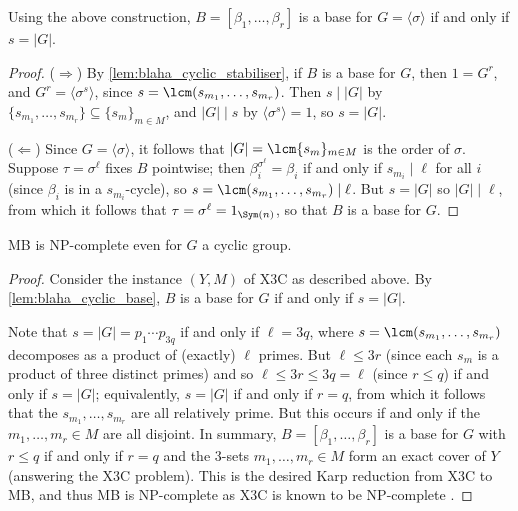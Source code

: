 \begin{lemma}\label{lem:blaha_cyclic_base}
    Using the above construction, $B = [\beta_1,\dotsc,\beta_r]$ is a base for $G = \langle \sigma \rangle$ if and only if $s = |G|$.
\end{lemma}

\begin{proof}
    ($\Longrightarrow$) By \autoref{lem:blaha_cyclic_stabiliser}, if $B$ is a base for $G$, then $1 = G^r$, and $G^r = \langle \sigma^s\rangle$, since $s = \lcm(s_{m_1},\dotsc,s_{m_r})$. Then $s \mid |G|$ by $\{s_{m_1},\dotsc,s_{m_r}\} \subseteq \{s_m\}_{m \in M}$, and $|G| \mid s$ by $\langle \sigma^s \rangle = 1$, so $s = |G|$.

    ($\Longleftarrow$) Since $G = \langle \sigma \rangle$, it follows that $|G| = \lcm\{s_m\}_{m \in M}$ is the order of $\sigma$. Suppose $\tau = \sigma^\ell$ fixes $B$ pointwise; then $\beta_i^{\sigma^\ell} = \beta_i$ if and only if $s_{m_i} \mid \ell$ for all $i$ (since $\beta_i$ is in a $s_{m_i}$-cycle), so $s = \lcm(s_{m_1},\dotsc,s_{m_r}) \mid \ell$. But $s = |G|$ so $|G| \mid \ell$, from which it follows that $\tau = \sigma^\ell = 1_{\Sym(n)}$, so that $B$ is a base for $G$.
\end{proof}


\begin{theorem}\label{thm:blaha_cyclic_NP_complete}
    MB is NP-complete even for $G$ a cyclic group.
\end{theorem}

\begin{proof}
    Consider the instance $(Y,M)$ of X3C as described above. By \autoref{lem:blaha_cyclic_base}, $B$ is a base for $G$ if and only if $s = |G|$.

    Note that $s = |G| = p_1 \dotsb p_{3q}$ if and only if $\ell = 3q$, where $s = \lcm(s_{m_1},\dotsc,s_{m_r})$ decomposes as a product of (exactly) $\ell$ primes. But $\ell \leq 3r$ (since each $s_m$ is a product of three distinct primes) and so $\ell \leq 3r \leq 3q = \ell$ (since $r \leq q$) if and only if $s = |G|$; equivalently, $s = |G|$ if and only if $r = q$, from which it follows that the $s_{m_1},\dotsc,s_{m_r}$ are all relatively prime. But this occurs if and only if the $m_1,\dotsc,m_r \in M$ are all disjoint. In summary, $B = [\beta_1,\dotsc,\beta_r]$ is a base for $G$ with $r \leq q$ if and only if $r = q$ and the 3-sets $m_1,\dotsc,m_r \in M$ form an exact cover of $Y$ (answering the X3C problem). This is the desired Karp reduction from X3C to MB, and thus MB is NP-complete as X3C is known to be NP-complete .
\end{proof}

